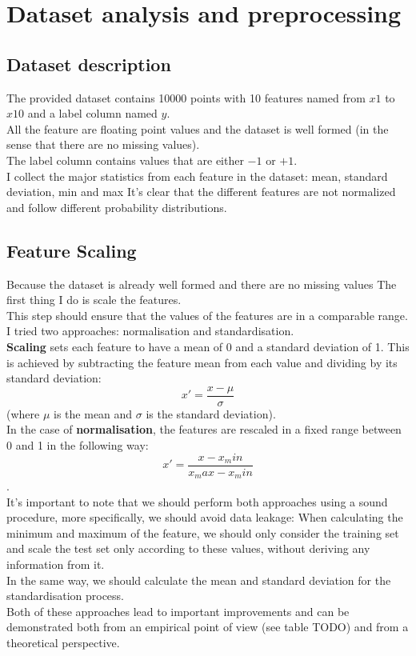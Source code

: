 \newpage
\section{Dataset analysis and preprocessing}
\subsection{Dataset description}
The provided dataset contains 10000 points with 10 features named from $x1$ to $x10$ and a label column named $y$.\\
All the feature are floating point values and the dataset is well formed (in the sense that there are no missing values).\\
The label column contains values that are either $-1$ or $+1$.\\
I collect the major statistics from each feature in the dataset: mean, standard deviation, min and max
It's clear that the different features are not normalized and follow different probability distributions.

\subsection{Feature Scaling}
Because the dataset is already well formed and there are no missing values The first thing I do is scale the features.\\
This step should ensure that the values of the features are in a comparable range.\\
I tried two approaches: normalisation and standardisation.\\
{\bf Scaling} sets each feature to have a mean of 0 and a standard deviation of 1.
This is achieved by subtracting the feature mean from each value and dividing by its standard deviation:
$$x' = \frac{x - \mu}{\sigma} $$
(where $\mu$ is the mean and $\sigma$ is the standard deviation).\\
In the case of {\bf normalisation}, the features are rescaled in a fixed range between 0 and 1 in the following way: $$x' = \frac{x - x_min}{x_max - x_min} $$.\\
It's important to note that we should perform both approaches using a sound procedure, more specifically, we should avoid data leakage:
When calculating the minimum and maximum of the feature, we should only consider the training set and scale the test set only according to these values, without deriving any information from it.\\
In the same way, we should calculate the mean and standard deviation for the standardisation process.\\
Both of these approaches lead to important improvements and can be demonstrated both from an empirical point of view (see table TODO) and from a theoretical perspective.


